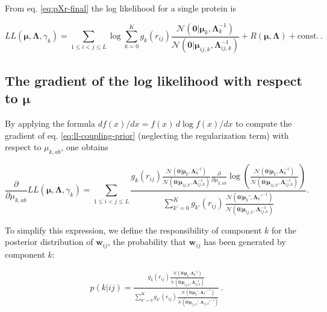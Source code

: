 \documentclass[12pt,a4paper,twoside]{book}
\newcommand{\Gauss}{\mathcal{N}}
\newcommand{\Lijk}{\mathbf{\Lambda}_{ij,k}}
\newcommand{\Lk}{\mathbf{\Lambda}_k}
\newcommand{\muijk}{\mathbf{\mu}_{ij,k}}
\newcommand{\muk}{\mathbf{\mu}_k}
\newcommand{\rij}{r_{ij}}
\newcommand{\wij}{\mathbf{w}_{ij}}
\theoremstyle{definition}
\theoremstyle{definition}
\theoremstyle{remark}
\begin{document}
From eq. \eqref{eq:pXr-final} the log likelihood for a single protein is

\begin{equation}
    L\!L(\mathbf{\mu}, \mathbf{\Lambda}, \gamma_k) =  \sum_{1 \le i < j \le L}  \log \sum_{k=0}^K g_{k}(\rij) \frac{\Gauss( \mathbf{0} | \muk, \Lk^{-1})}{\Gauss(\mathbf{0} | \muijk, \Lijk^{-1})}  + R(\mathbf{\mu}, \mathbf{\Lambda}) + \text{const.}\,.
\label{eq:ll-coupling-prior}
\end{equation}

\subsection{\texorpdfstring{The gradient of the log likelihood with
respect to
\(\mathbf{\mu}\)}{The gradient of the log likelihood with respect to \textbackslash{}mathbf\{\textbackslash{}mu\}}}\label{the-gradient-of-the-log-likelihood-with-respect-to-mathbfmu}

By applying the formula \(d f(x) / dx = f(x) \, d \log f(x) / dx\) to
compute the gradient of eq. \eqref{eq:ll-coupling-prior} (neglecting the
regularization term) with respect to \(\mu_{k,ab}\), one obtains

\begin{equation}
 \frac{\partial}{\partial \mu_{k,ab}} L\!L(\mathbf{\mu}, \mathbf{\Lambda}, \gamma_k)
    = \sum_{1\le i<j\le L}  
    \frac{ 
        g_{k}(\rij) \frac{  \Gauss ( \mathbf{0} | \muk, \Lk^{-1})}{\Gauss( \mathbf{0} | \muijk, \Lijk^{-1})} 
             \frac{\partial}{\partial \mu_{k,ab}}  \log \left( \frac{ \Gauss(\mathbf{0} | \muk, \Lk^{-1})}{\Gauss( \mathbf{0} | \muijk, \Lijk^{-1})} \right)  
     } { \sum_{k'=0}^K g_{k'}(\rij) \, \frac{ \Gauss(\mathbf{0} | \muk', \Lk'^{-1})}{\Gauss( \mathbf{0} | \muijk, \Lijk^{-1})}  } .
\label{eq:gradient-mukab}
\end{equation}

To simplify this expression, we define the responsibility of component
\(k\) for the posterior distribution of \(\wij\), the probability that
\(\wij\) has been generated by component \(k\):

\begin{align}
      p(k|ij)  = 
      \frac{ g_{k}(\rij) \frac{ \Gauss( \mathbf{0} | \muk, \Lk^{-1})}{\Gauss(\mathbf{0} | \muijk, \Lijk^{-1})} } 
    {\sum_{k'=0}^K g_{k'}(\rij) \frac{ \Gauss(\mathbf{0} | \muk', \Lk'^{-1})}{\Gauss( \mathbf{0} | \muijk', \Lijk'^{-1})} }  \,.
\label{eq:responsibilities}
\end{align}
\end{document}
